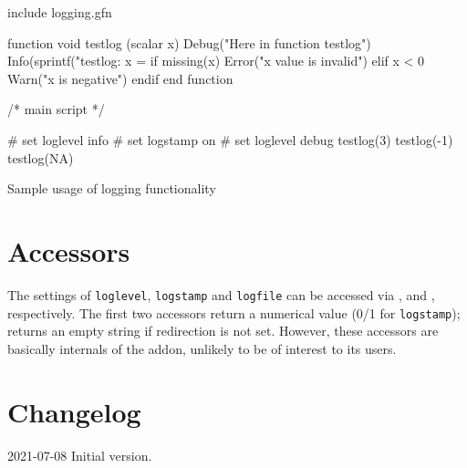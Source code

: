 \documentclass{article}
\begin{document}
\begin{script}[htbp]
\begin{scode}
include logging.gfn

function void testlog (scalar x)
   Debug("Here in function testlog")
   Info(sprintf("testlog: x = %
   if missing(x)
       Error("x value is invalid")
   elif x < 0
       Warn("x is negative")
   endif
end function

/* main script */

# set loglevel info
# set logstamp on
# set loglevel debug
testlog(3)
testlog(-1)
testlog(NA)
\end{scode}
\caption{Sample usage of logging functionality}
\label{listing:simple-ex}  
\end{script}

\section{Accessors}

The settings of \texttt{loglevel}, \texttt{logstamp} and
\texttt{logfile} can be accessed via ,
 and , respectively. The first two
accessors return a numerical value (0/1 for \texttt{logstamp});
 returns an empty string if redirection is not
set. However, these accessors are basically internals of the addon,
unlikely to be of interest to its users.

\section{Changelog}

2021-07-08 Initial version.
\end{document}
